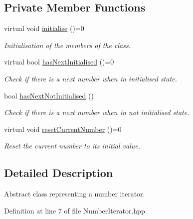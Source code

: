 \subsection*{\-Private \-Member \-Functions}
\begin{DoxyCompactItemize}
\item 
virtual void \hyperlink{classmultiscale_1_1NumberIterator_a0bfeef7c3f120a5ae8d49d89b4529d6e}{initialise} ()=0
\begin{DoxyCompactList}\small\item\em \-Initialisation of the members of the class. \end{DoxyCompactList}\item 
virtual bool \hyperlink{classmultiscale_1_1NumberIterator_a3c84ccdf0e279e67861b3cce34a26588}{has\-Next\-Initialised} ()=0
\begin{DoxyCompactList}\small\item\em \-Check if there is a next number when in initialised state. \end{DoxyCompactList}\item 
bool \hyperlink{classmultiscale_1_1NumberIterator_a446f1ec484d5e16092674c5de25150f1}{has\-Next\-Not\-Initialised} ()
\begin{DoxyCompactList}\small\item\em \-Check if there is a next number when in not initialised state. \end{DoxyCompactList}\item 
virtual void \hyperlink{classmultiscale_1_1NumberIterator_a21e658de178b6c957df5ea0482e6fbd6}{reset\-Current\-Number} ()=0
\begin{DoxyCompactList}\small\item\em \-Reset the current number to its initial value. \end{DoxyCompactList}\end{DoxyCompactItemize}


\subsection{\-Detailed \-Description}
\-Abstract class representing a number iterator. 

\-Definition at line 7 of file \-Number\-Iterator.\-hpp.



